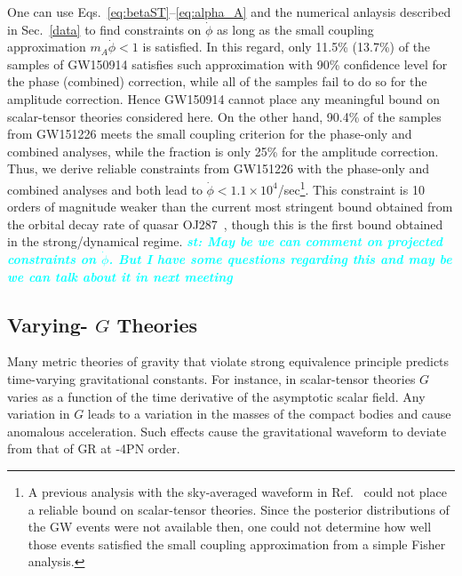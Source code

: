 \documentclass[prd,twocolumn,nofootinbib]{revtex4-1}
\newcommand{\st}[1]{\textcolor{cyan}{\it{\textbf{st: #1}}} }
\begin{document}
One can use Eqs.~\eqref{eq:betaST}--\eqref{eq:alpha_A} and the numerical anlaysis described in Sec.~\ref{data} to find constraints on $\dot{\phi}$ as long as the small coupling approximation $m_A\dot{\phi}<1$ is satisfied. In this regard, only 11.5\% (13.7\%) of the samples of GW150914 satisfies such approximation with 90\% confidence level for the phase (combined) correction, while all of the samples fail to do so for the amplitude correction. Hence GW150914 cannot place any meaningful bound on scalar-tensor theories considered here. On the other hand, 90.4\% of the samples from GW151226 meets the small coupling criterion for the phase-only and combined analyses, while the fraction is only 25\% for the amplitude correction. Thus, we derive reliable constraints from GW151226 with the phase-only and combined analyses and both lead to $\dot{\phi}<1.1\times10^4$/sec\footnote{A previous analysis with the sky-averaged waveform in Ref.~\cite{Yunes:2016jcc} could not place a reliable bound on scalar-tensor theories. Since the posterior distributions of the GW events were not available then, one could not determine how well those events satisfied the small coupling approximation from a simple Fisher analysis.}. This constraint is 10 orders of magnitude weaker than the current most stringent bound obtained from the orbital decay rate of quasar OJ287~\cite{Horbatsch:2011ye}, though this is the first bound obtained in the strong/dynamical regime. \st{May be we can comment on projected constraints on $\dot{\phi}$. But I have some questions regarding this and may be we can talk about it in next meeting}


\subsection{Varying- $G$ Theories}
Many metric theories of gravity that violate strong equivalence principle predicts time-varying gravitational constants. For instance, in scalar-tensor theories $G$ varies as a function of the time derivative of the asymptotic scalar field. Any variation in $G$ leads to a variation in the masses of the compact bodies and cause anomalous acceleration. Such effects cause the gravitational waveform to deviate from that of GR at -4PN order.
\end{document}
